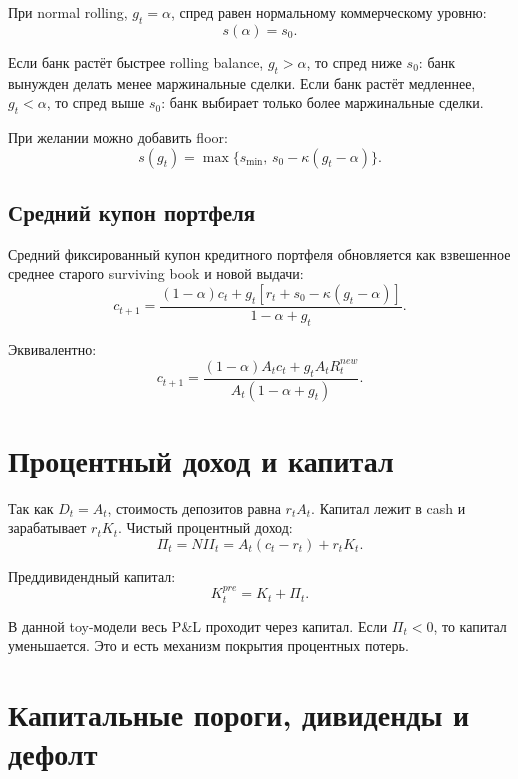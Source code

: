 \documentclass[11pt,a4paper]{article}
\newcommand{\1}{\mathbf{1}}
\begin{document}
При normal rolling, $g_t=\alpha$, спред равен нормальному коммерческому уровню:
\begin{equation}
    s(\alpha)=s_0.
\end{equation}

Если банк растёт быстрее rolling balance, $g_t>\alpha$, то спред ниже $s_0$: банк вынужден делать менее маржинальные сделки. Если банк растёт медленнее, $g_t<\alpha$, то спред выше $s_0$: банк выбирает только более маржинальные сделки.

При желании можно добавить floor:
\begin{equation}
    s(g_t)=\max\{s_{\min},\,s_0-\kappa(g_t-\alpha)\}.
\end{equation}

\subsection{Средний купон портфеля}

Средний фиксированный купон кредитного портфеля обновляется как взвешенное среднее старого surviving book и новой выдачи:
\begin{equation}
    c_{t+1}
    =
    \frac{(1-\alpha)c_t + g_t\left[r_t+s_0-\kappa(g_t-\alpha)\right]}
    {1-\alpha+g_t}.
\end{equation}

Эквивалентно:
\begin{equation}
    c_{t+1}
    =
    \frac{(1-\alpha)A_tc_t + g_tA_t R_t^{new}}
    {A_t(1-\alpha+g_t)}.
\end{equation}

\section{Процентный доход и капитал}

Так как $D_t=A_t$, стоимость депозитов равна $r_tA_t$. Капитал лежит в cash и зарабатывает $r_tK_t$. Чистый процентный доход:
\begin{equation}
    \Pi_t = NII_t = A_t(c_t-r_t)+r_tK_t.
\end{equation}

Преддивидендный капитал:
\begin{equation}
    K_t^{pre}=K_t+\Pi_t.
\end{equation}

В данной toy-модели весь P\&L проходит через капитал. Если $\Pi_t<0$, то капитал уменьшается. Это и есть механизм покрытия процентных потерь.

\section{Капитальные пороги, дивиденды и дефолт}
\end{document}
